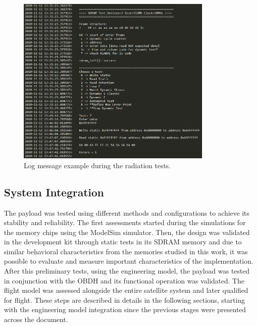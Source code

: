 \begin{figure}[!ht]
    \begin{center}
        \includegraphics[width=0.85\textwidth]{figures/log_test.png}
        \caption{Log message example during the radiation tests.}
        \label{fig:log_test_rad}
    \end{center}
\end{figure}



\subsection{System Integration}

The payload was tested using different methods and configurations to achieve its stability and reliability. The first assessments started during the simulations for the memory chips using the ModelSim simulator. Then, the design was validated in the development kit through static tests in its SDRAM memory and due to similar behavioral characteristics from the memories studied in this work, it was possible to evaluate and measure important characteristics of the implementation. After this preliminary tests, using the engineering model, the payload was tested in conjunction with the OBDH and its functional operation was validated. The flight model was assessed alongside the entire satellite system and later qualified for flight. These steps are described in details in the following sections, starting with the engineering model integration since the previous stages were presented across the document.  

